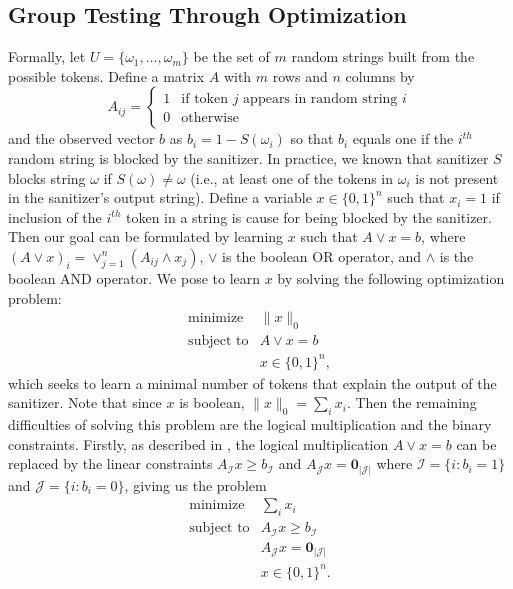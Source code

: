 \subsection{Group Testing Through Optimization}
\label{ss:grouptesting_optimization}
Formally, let $U=\{\omega_1,\ldots,\omega_m\}$ be the set of $m$ random strings built from the possible tokens.  Define a matrix $A$ with $m$ rows and $n$ columns by 
\[A_{ij}=
\begin{cases} 1 &\mbox{if token } j \mbox{ appears in random string } i \\
0 & \mbox{otherwise}
\end{cases} 
\]
and the observed vector $b$ as $b_i=1-S(\omega_i)$ so that $b_i$ equals one if the $i^{th}$ random string is blocked by the sanitizer.  In practice, we known that sanitizer $S$ blocks string $\omega$ if $S(\omega)\neq\omega$ (i.e., at least one of the tokens in $\omega_i$ is not present in the sanitizer's output string).  Define a variable $x\in\{0,1\}^n$ such that $x_i=1$ if inclusion of the $i^{th}$ token in a string is cause for being blocked by the sanitizer.  Then our goal can be formulated by learning $x$ such that $A\vee x=b$, where $(A\vee x)_i=\vee_{j=1}^n(A_{ij}\wedge x_j)$, $\vee$ is the boolean OR operator, and $\wedge$ is the boolean AND operator.  We pose to learn $x$ by solving the following optimization problem:
\[\begin{array}{ll}
\mbox{minimize} & \|x\|_0\\
\mbox{subject to} & A\vee x=b \\
& x\in\{0,1\}^n,
\end{array}\]
which seeks to learn a minimal number of tokens that explain the output of the sanitizer. Note that since $x$ is boolean, $\|x\|_0=\sum_i{x_i}$.  Then the remaining difficulties of solving this problem are the logical multiplication and the binary constraints.  Firstly, as described in \cite{MalioutovM2012}, the logical multiplication $A\vee x=b$ can be replaced by the linear constraints $A_\mathcal{I}x\geq b_\mathcal{I}$ and $A_\mathcal{J}x=\textbf{0}_{|\mathcal{J}|}$ where $\mathcal{I}=\{i : b_i=1\}$ and $\mathcal{J}=\{i : b_i=0\}$, giving us the problem
\[\begin{array}{ll}
\mbox{minimize} & \sum_i{x_i}\\
\mbox{subject to} & A_\mathcal{I}x\geq b_\mathcal{I} \\
& A_\mathcal{J}x=\textbf{0}_{|\mathcal{J}|} \\
& x\in\{0,1\}^n.
\end{array}\]
